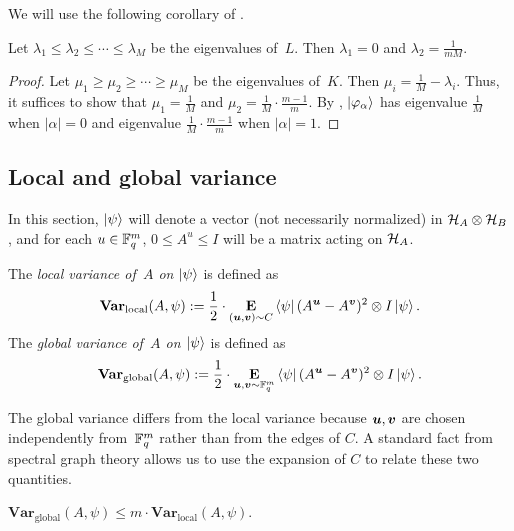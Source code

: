 We will use the following corollary of .

\begin{corollary}\label{cor:laplacian-spectral-gap}
Let $\lambda_1 \leq \lambda_2 \leq \cdots \leq \lambda_M$ be the eigenvalues of~$L$. Then $\lambda_1 = 0$ and $\lambda_2 = \frac{1}{m M}$.
\end{corollary}
\begin{proof}
Let $\mu_1 \geq \mu_2 \geq \cdots \geq \mu_M$ be the eigenvalues of~$K$. Then $\mu_i = \frac{1}{M} - \lambda_i$.
Thus, it suffices to show that $\mu_1 = \frac{1}{M}$ and $\mu_2 = \frac{1}{M} \cdot \frac{m-1}{m}$.
By , $\ket{\varphi_\alpha}$ has eigenvalue $\frac{1}{M}$ when $|\alpha| = 0$ and eigenvalue $\frac{1}{M} \cdot \frac{m-1}{m}$ when $|\alpha| =1$.
\end{proof}



\subsection{Local and global variance}

In this section, $\ket{\psi}$ will denote a vector (not necessarily normalized) in $\mathcal{H}_A \otimes \mathcal{H}_B$,
and for each $u \in \mathbb F_q^m$, $0 \leq A^u \leq I$ will be a matrix acting on $\mathcal{H}_A$.

\begin{definition}\label{def:local-and-variance}
The \emph{local variance of~$A$ on $\ket{\psi}$} is defined as
\begin{equation*}
\mathbf{Var}_{\mathrm{local}}(A, \psi):=\frac{1}{2} \cdot\mathop{\bf E\/}_{(\boldsymbol{u}, \boldsymbol{v}) \sim C} \bra{\psi} (A^{\boldsymbol{u}} - A^{\boldsymbol{v}})^2 \otimes I \ket{\psi}.
\end{equation*}
The \emph{global variance of~$A$ on $\ket{\psi}$} is defined as
\begin{equation*}
\mathbf{Var}_{\mathrm{global}}(A, \psi):=\frac{1}{2} \cdot\mathop{\bf E\/}_{\boldsymbol{u}, \boldsymbol{v} \sim \mathbb F_q^m} \bra{\psi} (A^{\boldsymbol{u}} - A^{\boldsymbol{v}})^2 \otimes I \ket{\psi}.
\end{equation*}
\end{definition}

The global variance differs from the local variance
because $\boldsymbol{u}, \boldsymbol{v}$ are chosen independently from~$\mathbb F_q^m$
rather than from the edges of $C$.
A standard fact from spectral graph theory allows us to 
use the expansion of $C$ to relate these two quantities.

\begin{lemma}\label{lem:local-to-global}
$\displaystyle
\mathbf{Var}_{\mathrm{global}}(A, \psi) \leq  m \cdot \mathbf{Var}_{\mathrm{local}}(A,\psi).
$
\end{lemma}

